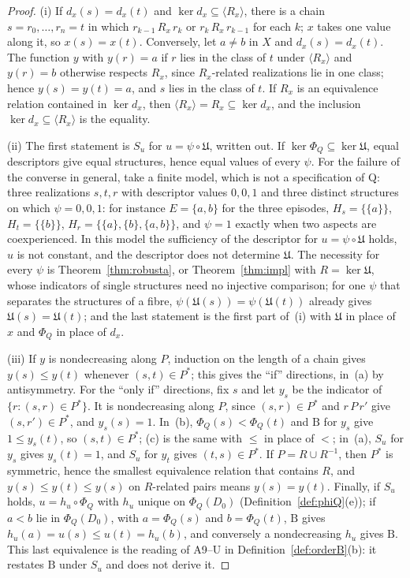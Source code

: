\begin{proof}
(i) If $d_x(s)=d_x(t)$ and $\ker d_x\subseteq\langle R_x\rangle$, there is a chain $s=r_0,\dots,r_n=t$ in which $r_{k-1}\,R_x\,r_k$ or $r_k\,R_x\,r_{k-1}$ for each $k$; $x$ takes one value along it, so $x(s)=x(t)$. Conversely, let $a\ne b$ in $X$ and $d_x(s)=d_x(t)$. The function $y$ with $y(r)=a$ if $r$ lies in the class of $t$ under $\langle R_x\rangle$ and $y(r)=b$ otherwise respects $R_x$, since $R_x$-related realizations lie in one class; hence $y(s)=y(t)=a$, and $s$ lies in the class of $t$. If $R_x$ is an equivalence relation contained in $\ker d_x$, then $\langle R_x\rangle=R_x\subseteq\ker d_x$, and the inclusion $\ker d_x\subseteq\langle R_x\rangle$ is the equality.

(ii) The first statement is $S_u$ for $u=\psi\circ\mathfrak U$, written out. If $\ker\Phi_Q\subseteq\ker\mathfrak U$, equal descriptors give equal structures, hence equal values of every $\psi$. For the failure of the converse in general, take a finite model, which is not a specification of Q: three realizations $s,t,r$ with descriptor values $0,0,1$ and three distinct structures on which $\psi=0,0,1$: for instance $E=\{a,b\}$ for the three episodes, $H_s=\{\{a\}\}$, $H_t=\{\{b\}\}$, $H_r=\{\{a\},\{b\},\{a,b\}\}$, and $\psi=1$ exactly when two aspects are coexperienced. In this model the sufficiency of the descriptor for $u=\psi\circ\mathfrak U$ holds, $u$ is not constant, and the descriptor does not determine $\mathfrak U$. The necessity for every $\psi$ is Theorem~\ref{thm:robusta}, or Theorem~\ref{thm:impl} with $R=\ker\mathfrak U$, whose indicators of single structures need no injective comparison; for one $\psi$ that separates the structures of a fibre, $\psi(\mathfrak U(s))=\psi(\mathfrak U(t))$ already gives $\mathfrak U(s)=\mathfrak U(t)$; and the last statement is the first part of~(i) with $\mathfrak U$ in place of $x$ and $\Phi_Q$ in place of $d_x$.

(iii) If $y$ is nondecreasing along $P$, induction on the length of a chain gives $y(s)\le y(t)$ whenever $(s,t)\in P^\ast$; this gives the ``if'' directions, in~(a) by antisymmetry. For the ``only if'' directions, fix $s$ and let $y_s$ be the indicator of $\{r:(s,r)\in P^\ast\}$. It is nondecreasing along $P$, since $(s,r)\in P^\ast$ and $r\,P\,r'$ give $(s,r')\in P^\ast$, and $y_s(s)=1$. In~(b), $\Phi_Q(s)<\Phi_Q(t)$ and $\mathrm B$ for $y_s$ give $1\le y_s(t)$, so $(s,t)\in P^\ast$; (c) is the same with $\le$ in place of $<$; in~(a), $S_u$ for $y_s$ gives $y_s(t)=1$, and $S_u$ for $y_t$ gives $(t,s)\in P^\ast$. If $P=R\cup R^{-1}$, then $P^\ast$ is symmetric, hence the smallest equivalence relation that contains $R$, and $y(s)\le y(t)\le y(s)$ on $R$-related pairs means $y(s)=y(t)$. Finally, if $S_u$ holds, $u=h_u\circ\Phi_Q$ with $h_u$ unique on $\Phi_Q(D_0)$ (Definition~\ref{def:phiQ}(e)); if $a<b$ lie in $\Phi_Q(D_0)$, with $a=\Phi_Q(s)$ and $b=\Phi_Q(t)$, $\mathrm B$ gives $h_u(a)=u(s)\le u(t)=h_u(b)$, and conversely a nondecreasing $h_u$ gives $\mathrm B$. This last equivalence is the reading of A9--U in Definition~\ref{def:orderB}(b): it restates $\mathrm B$ under $S_u$ and does not derive it.


\end{proof}
